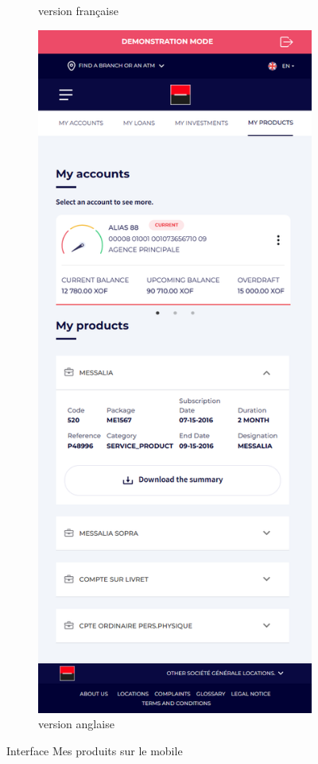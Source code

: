 \begin{figure}[!ht]
\begin{subfigure}[b]{0.49\textwidth}
        \caption{version française}
    \end{subfigure}
    \hfill
    \begin{subfigure}[b]{0.49\textwidth}
        \centering
        \includegraphics[width=\textwidth]{images/screens/products/mob.png}
        \caption{version anglaise}
    \end{subfigure}
       \caption{Interface Mes produits sur le mobile}
\end{figure}


